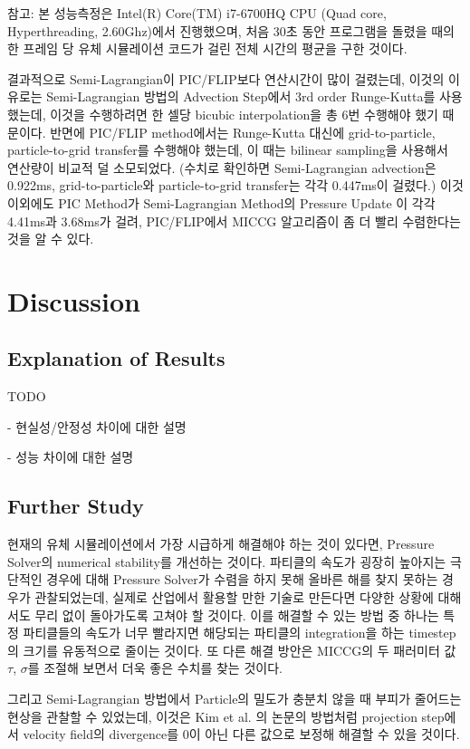 \documentclass[10pt, A4]{article}
\begin{document}
참고: 본 성능측정은 Intel(R) Core(TM) i7-6700HQ CPU (Quad core, Hyperthreading, 2.60Ghz)에서 진행했으며, 처음 30초 동안 프로그램을 돌렸을 때의 한 프레임 당 유체 시뮬레이션 코드가 걸린 전체 시간의 평균을 구한 것이다.

결과적으로 Semi-Lagrangian이 PIC/FLIP보다 연산시간이 많이 걸렸는데, 이것의 이유로는 Semi-Lagrangian 방법의 Advection Step에서 3rd order Runge-Kutta를 사용했는데, 이것을 수행하려면 한 셀당 bicubic interpolation을 총 6번 수행해야 했기 때문이다. 반면에 PIC/FLIP method에서는 Runge-Kutta 대신에 grid-to-particle, particle-to-grid transfer를 수행해야 했는데, 이 때는 bilinear sampling을 사용해서 연산량이 비교적 덜 소모되었다. (수치로 확인하면 Semi-Lagrangian advection은 0.922ms, grid-to-particle와 particle-to-grid transfer는 각각 0.447ms이 걸렸다.) 이것 이외에도 PIC Method가 Semi-Lagrangian Method의 Pressure Update 이 각각 4.41ms과 3.68ms가 걸려, PIC/FLIP에서 MICCG 알고리즘이 좀 더 빨리 수렴한다는 것을 알 수 있다.

\section{Discussion}

\subsection{Explanation of Results}

TODO

- 현실성/안정성 차이에 대한 설명

- 성능 차이에 대한 설명

\subsection{Further Study}

현재의 유체 시뮬레이션에서 가장 시급하게 해결해야 하는 것이 있다면, Pressure Solver의 numerical stability를 개선하는 것이다. 파티클의 속도가 굉장히 높아지는 극단적인 경우에 대해 Pressure Solver가 수렴을 하지 못해 올바른 해를 찾지 못하는 경우가 관찰되었는데, 실제로 산업에서 활용할 만한 기술로 만든다면 다양한 상황에 대해서도 무리 없이 돌아가도록 고쳐야 할 것이다. 이를 해결할 수 있는 방법 중 하나는 특정 파티클들의 속도가 너무 빨라지면 해당되는 파티클의 integration을 하는 timestep의 크기를 유동적으로 줄이는 것이다. \cite[p. 35]{fluid-sim-cg} 또 다른 해결 방안은 MICCG의 두 패러미터 값 $\tau$, $\sigma$를 조절해 보면서 더욱 좋은 수치를 찾는 것이다.

그리고 Semi-Lagrangian 방법에서 Particle의 밀도가 충분치 않을 때 부피가 줄어드는 현상을 관찰할 수 있었는데, 이것은 Kim et al. \cite{volume-preservation} 의 논문의 방법처럼 projection step에서 velocity field의 divergence를 0이 아닌 다른 값으로 보정해 해결할 수 있을 것이다.
\end{document}
